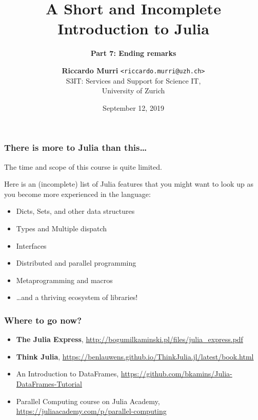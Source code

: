 \documentclass[english,serif,mathserif,xcolor=pdftex,dvipsnames,table]{beamer}
\title[Introduction to Julia]{%
  A Short and Incomplete Introduction to Julia
}
\subtitle{\bfseries Part 7: Ending remarks}
\author[R.~Murri]{%
  \textbf{Riccardo Murri} \texttt{<riccardo.murri@uzh.ch>}
  \\
  S3IT: Services and Support for Science IT,
  \\
  University of Zurich
}
\date{September 12, 2019}
\begin{document}
\maketitle


\begin{frame}
  \frametitle{There is more to Julia than this\ldots}

  The time and scope of this course is quite limited.

  \+
  Here is an (incomplete) list of Julia features that you might
  want to look up as you become more experienced in the language:
  \begin{itemize}
  \item Dicts, Sets, and other data structures
  \item Types and Multiple dispatch
  \item Interfaces
  \item Distributed and parallel programming
  \item Metaprogramming and macros
  \item \ldots and a thriving ecosystem of libraries!
  \end{itemize}
\end{frame}




\begin{frame}[fragile]
  \frametitle{Where to go now?}

  \begin{itemize}
  \item \textbf{The Julia Express},
    {\small \url{http://bogumilkaminski.pl/files/julia_express.pdf}}
  \item \textbf{Think Julia},
    {\small\url{https://benlauwens.github.io/ThinkJulia.jl/latest/book.html}}
  \item {An Introduction to DataFrames},
    {\small\url{https://github.com/bkamins/Julia-DataFrames-Tutorial}}
  \item {Parallel Computing course on Julia Academy},
    {\small\url{https://juliaacademy.com/p/parallel-computing}}
  \end{itemize}
\end{frame}
\end{document}
